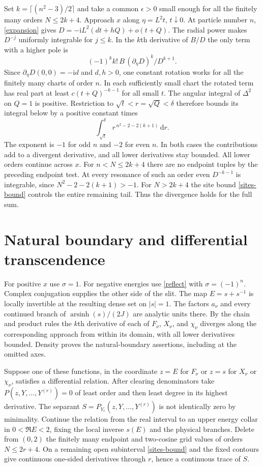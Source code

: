 \documentclass[11pt]{article}
\newcommand{\ii}{\mathrm i}
\newcommand{\dd}{\,\mathrm d}
\DeclareMathOperator{\arsinh}{arsinh}
\begin{document}
Set $k=\lceil(n^2-3)/2\rceil$ and take a common $\epsilon>0$ small
enough for all the finitely many orders $N\le2k+4$.
Approach $x$ along $\eta=L^2t$, $t\downarrow0$. At particle number $n$,
\eqref{expansion} gives $D=-\ii L^2(dt+hQ)+o(t+Q)$.
The radial power makes $D^{-j}$ uniformly integrable for $j\le k$.
In the $k$th derivative of $B/D$ the only
term with a higher pole is
\[
 (-1)^k k!\,B\,(\partial_\eta D)^k/D^{k+1}.
\]
Since $\partial_\eta D(0,0)=-\ii d$ and $d,h>0$, one constant rotation
works for all the finitely many charts of order $n$. In each sufficiently
small chart the rotated term has real part at least $c(t+Q)^{-k-1}$
for all small $t$. The angular integral
of $\Delta^2$ on $Q=1$ is positive. Restriction to
$\sqrt t<r=\sqrt Q<\delta$ therefore bounds its integral below by
a positive constant times
\[
 \int_{\sqrt t}^\delta r^{\,n^2-2-2(k+1)}\dd r .
\]
The exponent is $-1$ for odd $n$ and $-2$ for even $n$. In both
cases the contributions add to a divergent derivative, and all lower
derivatives stay bounded.
All lower orders continue across $x$. For $n<N\le2k+4$ there are
no endpoint tuples by the preceding endpoint test. At every resonance
of such an order even $D^{-k-1}$ is integrable, since
$N^2-2-2(k+1)>-1$. For $N>2k+4$ the site bound
\eqref{sites-bound} controls the entire remaining tail. Thus the
divergence holds for the full sum.

\section{Natural boundary and differential transcendence}

For positive $x$ use $\sigma=1$. For negative energies use
\eqref{reflect} with $\sigma=(-1)^n$. Complex conjugation supplies
the other side of the slit. The map $E=s+s^{-1}$ is locally
invertible at the resulting dense set on $|s|=1$. The factors
$a_\nu$ and every continued branch of $\arsinh(s)/(2J)$ are analytic
units there. By the chain and product rules the $k$th derivative of
each of $F_\nu$, $X_\nu$, and $\chi_\nu$ diverges along the corresponding
approach from within its domain, with all lower derivatives bounded. Density proves the
natural-boundary assertions, including at the omitted axes.

Suppose one of these functions, in the coordinate $z=E$ for $F_\nu$
or $z=s$ for $X_\nu$ or $\chi_\nu$, satisfies a differential
relation. After clearing denominators take $P(z,Y,\ldots,Y^{(r)})=0$
of least order and then least degree in its highest derivative.
The separant $S=P_{Y_r}(z,Y,\ldots,Y^{(r)})$ is not identically zero
by minimality. Continue the relation from the real interval to an
upper energy collar in $0<\Re E<2$, fixing the local inverse $s(E)$
and the physical branches. Delete
from $(0,2)$ the finitely many endpoint and two-cosine grid values
of orders $N\le2r+4$. On a remaining open subinterval
\eqref{sites-bound} and the fixed contours give continuous one-sided
derivatives through $r$, hence a continuous trace of $S$.
\end{document}
